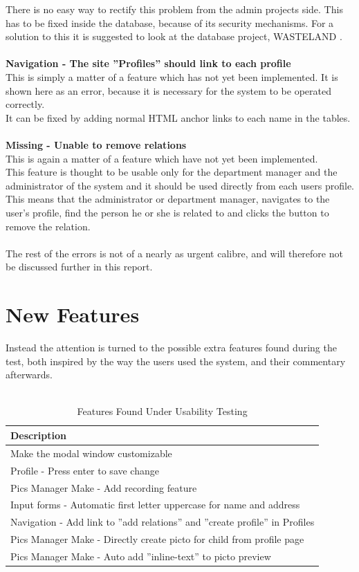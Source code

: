 There is no easy way to rectify this problem from the admin projects side. This has to be fixed inside the database, because of its security mechanisms. For a solution to this it is suggested to look at the database project, WASTELAND \citep{wasteland}.\\
\\
\textbf{Navigation - The site ''Profiles'' should link to each profile}\\
This is simply a matter of a feature which has not yet been implemented. It is shown here as an error, because it is necessary for the system to be operated correctly.\\
It can be fixed by adding normal HTML anchor links to each name in the tables.\\
\\
\textbf{Missing - Unable to remove relations}\\
This is again a matter of a feature which have not yet been implemented.\\
This feature is thought to be usable only for the department manager and the administrator of the system and it should be used directly from each users profile. This means that the administrator or department manager, navigates to the user's profile, find the person he or she is related to and clicks the button to remove the relation.\\
\\
The rest of the errors is not of a nearly as urgent calibre, and will therefore not be discussed further in this report.\\

\section{New Features}
Instead the attention is turned to the possible extra features found during the test, both inspired by the way the users used the system, and their commentary afterwards.\\
\\

\begin{table}[htbp]
	\centering
		\begin{tabular}{|l|}
			\hline
			Description\\\hline\hline
			Make the modal window customizable \\\hline
			Profile - Press enter to save change \\\hline
			Pics Manager Make - Add recording feature\\\hline
			Input forms - Automatic first letter uppercase for name and address\\\hline  
			Navigation - Add link to ''add relations'' and ''create profile'' in Profiles \\\hline  
			Pics Manager Make - Directly create picto for child from profile page \\\hline
			Pics Manager Make - Auto add ''inline-text'' to picto preview \\\hline
		\end{tabular}
	\caption{Features Found Under Usability Testing}
	\label{tab:NewFeature}
\end{table}	

